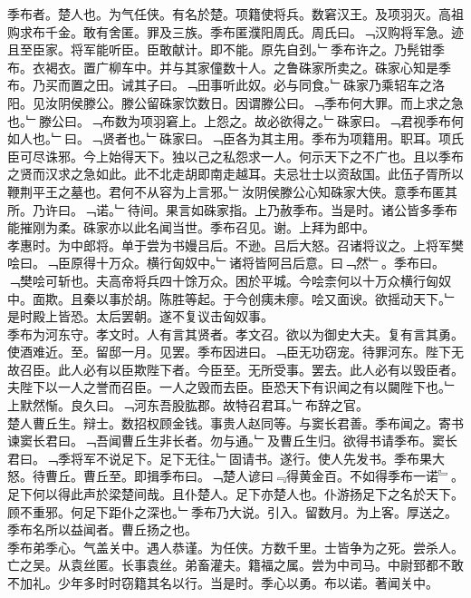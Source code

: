\documentclass{zhvt-classic}
\begin{document}

\hspace*{2em}季布者。楚人也。为气任侠。有名於楚。项籍使将兵。数窘汉王。及项羽灭。高祖购求布千金。敢有舍匿。罪及三族。季布匿濮阳周氏。周氏曰。﹁汉购将军急。迹且至臣家。将军能听臣。臣敢献计。即不能。原先自刭。﹂季布许之。乃髡钳季布。衣褐衣。置广柳车中。并与其家僮数十人。之鲁硃家所卖之。硃家心知是季布。乃买而置之田。诫其子曰。﹁田事听此奴。必与同食。﹂硃家乃乘轺车之洛阳。见汝阴侯滕公。滕公留硃家饮数日。因谓滕公曰。﹁季布何大罪。而上求之急也。﹂滕公曰。﹁布数为项羽窘上。上怨之。故必欲得之。﹂硃家曰。﹁君视季布何如人也。﹂曰。﹁贤者也。﹂硃家曰。﹁臣各为其主用。季布为项籍用。职耳。项氏臣可尽诛邪。今上始得天下。独以己之私怨求一人。何示天下之不广也。且以季布之贤而汉求之急如此。此不北走胡即南走越耳。夫忌壮士以资敌国。此伍子胥所以鞭荆平王之墓也。君何不从容为上言邪。﹂汝阴侯滕公心知硃家大侠。意季布匿其所。乃许曰。﹁诺。﹂待间。果言如硃家指。上乃赦季布。当是时。诸公皆多季布能摧刚为柔。硃家亦以此名闻当世。季布召见。谢。上拜为郎中。\\
\hspace*{2em}孝惠时。为中郎将。单于尝为书嫚吕后。不逊。吕后大怒。召诸将议之。上将军樊哙曰。﹁臣原得十万众。横行匈奴中。﹂诸将皆阿吕后意。曰﹁然﹂。季布曰。﹁樊哙可斩也。夫高帝将兵四十馀万众。困於平城。今哙柰何以十万众横行匈奴中。面欺。且秦以事於胡。陈胜等起。于今创痍未瘳。哙又面谀。欲摇动天下。﹂是时殿上皆恐。太后罢朝。遂不复议击匈奴事。\\
\hspace*{2em}季布为河东守。孝文时。人有言其贤者。孝文召。欲以为御史大夫。复有言其勇。使酒难近。至。留邸一月。见罢。季布因进曰。﹁臣无功窃宠。待罪河东。陛下无故召臣。此人必有以臣欺陛下者。今臣至。无所受事。罢去。此人必有以毁臣者。夫陛下以一人之誉而召臣。一人之毁而去臣。臣恐天下有识闻之有以闚陛下也。﹂上默然惭。良久曰。﹁河东吾股肱郡。故特召君耳。﹂布辞之官。\\
\hspace*{2em}楚人曹丘生。辩士。数招权顾金钱。事贵人赵同等。与窦长君善。季布闻之。寄书谏窦长君曰。﹁吾闻曹丘生非长者。勿与通。﹂及曹丘生归。欲得书请季布。窦长君曰。﹁季将军不说足下。足下无往。﹂固请书。遂行。使人先发书。季布果大怒。待曹丘。曹丘至。即揖季布曰。﹁楚人谚曰﹃得黄金百。不如得季布一诺﹄。足下何以得此声於梁楚间哉。且仆楚人。足下亦楚人也。仆游扬足下之名於天下。顾不重邪。何足下距仆之深也。﹂季布乃大说。引入。留数月。为上客。厚送之。季布名所以益闻者。曹丘扬之也。\\
\hspace*{2em}季布弟季心。气盖关中。遇人恭谨。为任侠。方数千里。士皆争为之死。尝杀人。亡之吴。从袁丝匿。长事袁丝。弟畜灌夫。籍福之属。尝为中司马。中尉郅都不敢不加礼。少年多时时窃籍其名以行。当是时。季心以勇。布以诺。著闻关中。\\
\end{document}
